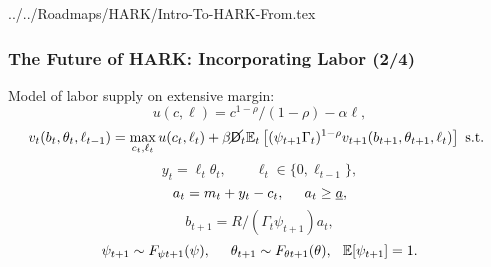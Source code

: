 \documentclass[public]{beamer}\beamerdefaultoverlayspecification{<+->}
\begin{document}
\begin{verbatimwrite}{../../Roadmaps/HARK/Intro-To-HARK-From.tex}
  \begin{frame}
    \frametitle{The Future of HARK: Incorporating Labor (2/4)}
    Model of labor supply on extensive margin:
    \begin{equation*}
      u(c,\ell) = c^{1-\rho}/(1-\rho) - \alpha \ell,
    \end{equation*}
    \begin{equation*}
      v_t(b_t,\theta_t,\ell_{t-1}) = \max_{c_t, \ell_t} u(c_t,\ell_t) + \beta \cancel{\mathsf{D}}_t \mathbb{E}_t \left[(\psi_{t+1} \Gamma_t)^{1-\rho} v_{t+1}(b_{t+1},\theta_{t+1},\ell_t) \right] \text{ s.t. }
    \end{equation*}
    \begin{equation*}
      y_t = \ell_t \theta_t, \qquad \ell_t \in \{0,\ell_{t-1}\},
    \end{equation*}
    \begin{equation*}
      a_t = m_t + y_t - c_t, \hspace{0.5cm} a_t \geq \underline{a},
    \end{equation*}
    \begin{equation*}
      b_{t+1} = R/(\Gamma_t \psi_{t+1}) a_t, 
    \end{equation*}
    \begin{equation*}
      \psi_{t+1} \sim F_{\psi t+1}(\psi), \hspace{0.5cm} \theta_{t+1} \sim F_{\theta t+1}(\theta), \hspace{0.25cm} \mathbb{E}[\psi_{t+1}] = 1.
    \end{equation*}
  \end{frame}




\end{verbatimwrite}
\end{document}

